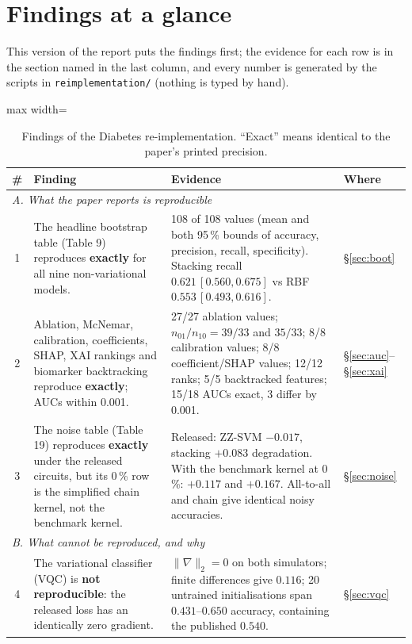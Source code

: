 \documentclass[11pt,a4paper]{article}
\newcommand{\OK}[1]{\textcolor{ok}{\textbf{#1}}}
\newcommand{\BAD}[1]{\textcolor{bad}{\textbf{#1}}}
\newcommand{\code}[1]{\texttt{\small #1}}
\begin{document}
\tableofcontents
\clearpage

\section{Findings at a glance}
\label{sec:findings}
This version of the report puts the findings first; the evidence for each row is in the section named in the last column, and every number is generated by the scripts in \code{reimplementation/} (nothing is typed by hand).

\begin{table}[H]
\centering\footnotesize
\caption{Findings of the Diabetes re-implementation. ``Exact'' means identical to the paper's printed precision.}
\label{tab:findings}
\begin{adjustbox}{max width=\textwidth}
\begin{tabular}{c p{5.6cm} p{6.6cm} l}
\toprule
\# & Finding & Evidence & Where \\
\midrule
\multicolumn{4}{l}{\textit{A. What the paper reports is reproducible}} \\
1 & The headline bootstrap table (Table 9) reproduces \OK{exactly} for all nine non-variational models. & 108 of 108 values (mean and both 95\,\% bounds of accuracy, precision, recall, specificity). Stacking recall $0.621\,[0.560,0.675]$ vs RBF $0.553\,[0.493,0.616]$. & \S\ref{sec:boot} \\
2 & Ablation, McNemar, calibration, coefficients, SHAP, XAI rankings and biomarker backtracking reproduce \OK{exactly}; AUCs within 0.001. & 27/27 ablation values; $n_{01}/n_{10}=39/33$ and $35/33$; 8/8 calibration values; 8/8 coefficient/SHAP values; 12/12 ranks; 5/5 backtracked features; 15/18 AUCs exact, 3 differ by 0.001. & \S\ref{sec:auc}--\S\ref{sec:xai} \\
3 & The noise table (Table 19) reproduces \OK{exactly} under the released circuits, but its 0\,\% row is the simplified chain kernel, not the benchmark kernel. & Released: ZZ-SVM $-0.017$, stacking $+0.083$ degradation. With the benchmark kernel at 0\,\%: $+0.117$ and $+0.167$. All-to-all and chain give identical noisy accuracies. & \S\ref{sec:noise} \\
\midrule
\multicolumn{4}{l}{\textit{B. What cannot be reproduced, and why}} \\
4 & The variational classifier (VQC) is \BAD{not reproducible}: the released loss has an identically zero gradient. & $\|\nabla\|_2=0$ on both simulators; finite differences give $0.116$; 20 untrained initialisations span $0.431$--$0.650$ accuracy, containing the published $0.540$. & \S\ref{sec:vqc} \\

\end{tabular}
\end{adjustbox}
\end{table}
\end{document}
